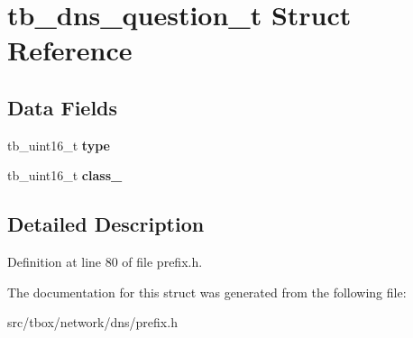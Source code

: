 \hypertarget{structtb__dns__question__t}{\section{tb\-\_\-dns\-\_\-question\-\_\-t Struct Reference}
\label{structtb__dns__question__t}
}
\subsection*{Data Fields}
\begin{DoxyCompactItemize}
\item 
\hypertarget{structtb__dns__question__t_ac7e478b0e27e8d7a603787352d0122db}{tb\-\_\-uint16\-\_\-t {\bfseries type}}\label{structtb__dns__question__t_ac7e478b0e27e8d7a603787352d0122db}

\item 
\hypertarget{structtb__dns__question__t_a98f8e1d401dd9e23af8caa3532582cc0}{tb\-\_\-uint16\-\_\-t {\bfseries class\-\_\-}}\label{structtb__dns__question__t_a98f8e1d401dd9e23af8caa3532582cc0}

\end{DoxyCompactItemize}


\subsection{Detailed Description}


Definition at line 80 of file prefix.\-h.



The documentation for this struct was generated from the following file\-:\begin{DoxyCompactItemize}
\item 
src/tbox/network/dns/prefix.\-h\end{DoxyCompactItemize}
